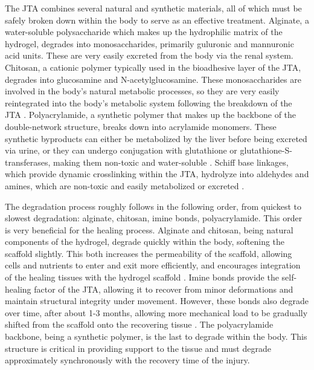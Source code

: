The JTA combines several natural and synthetic materials, all of which must be safely broken down within the body to serve as an effective treatment. Alginate, a water-soluble polysaccharide which makes up the hydrophilic matrix of the hydrogel, degrades into monosaccharides, primarily guluronic and mannuronic acid units. These are very easily excreted from the body via the renal system. 
Chitosan, a cationic polymer typically used in the bioadhesive layer of the JTA, degrades into glucosamine and N-acetylglucosamine. These monosaccharides are involved in the body's natural metabolic processes, so they are very easily reintegrated into the body's metabolic system following the breakdown of the JTA \autocite{guarinoDegradationPropertiesMetabolic2015}.
Polyacrylamide, a synthetic polymer that makes up the backbone of the double-network structure, breaks down into acrylamide monomers. These synthetic byproducts can either be metabolized by the liver before being excreted via urine, or they can undergo conjugation with glutathione or glutathione-S-transferases, making them non-toxic and water-soluble \autocite{xiongPolyacrylamideDegradationIts2018}.
Schiff base linkages, which provide dynamic crosslinking within the JTA, hydrolyze into aldehydes and amines, which are non-toxic and easily metabolized or excreted \autocite{xuHydrogelsBasedSchiff2019}.

The degradation process roughly follows in the following order, from quickest to slowest degradation: alginate, chitosan, imine bonds, polyacrylamide. This order is very beneficial for the healing process. Alginate and chitosan, being natural components of the hydrogel, degrade quickly within the body, softening the scaffold slightly.
This both increases the permeability of the scaffold, allowing cells and nutrients to enter and exit more efficiently, and encourages integration of the healing tissues with the hydrogel scaffold \autocite{RN4}.
Imine bonds provide the self-healing factor of the JTA, allowing it to recover from minor deformations and maintain structural integrity under movement. However, these bonds also degrade over time, after about 1-3 months, allowing more mechanical load to be gradually shifted from the scaffold onto the recovering tissue \autocite{xuHydrogelsBasedSchiff2019}.
The polyacrylamide backbone, being a synthetic polymer, is the last to degrade within the body. This structure is critical in providing support to the tissue and must degrade approximately synchronously with the recovery time of the injury.